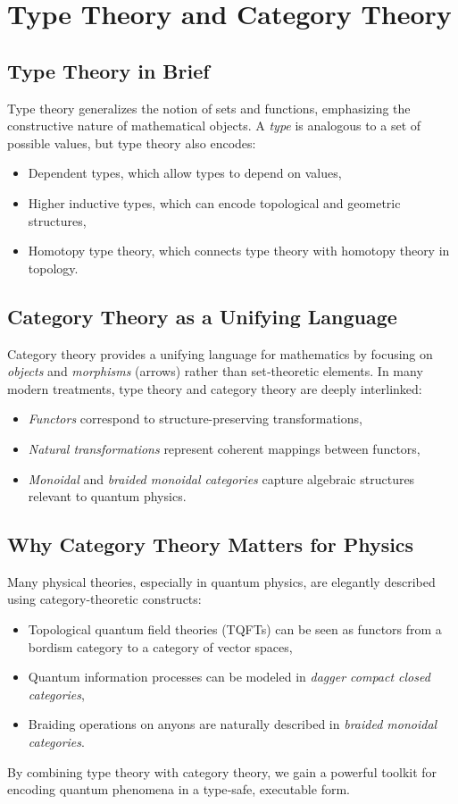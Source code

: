 \documentclass[12pt]{article}
\begin{document}
\section{Type Theory and Category Theory}
\label{sec:type_theory_cat}

\subsection{Type Theory in Brief}
Type theory generalizes the notion of sets and functions, emphasizing the constructive nature of mathematical objects. A \emph{type} is analogous to a set of possible values, but type theory also encodes:
\begin{itemize}[label=$\bullet$]
    \item Dependent types, which allow types to depend on values,
    \item Higher inductive types, which can encode topological and geometric structures,
    \item Homotopy type theory, which connects type theory with homotopy theory in topology.
\end{itemize}

\subsection{Category Theory as a Unifying Language}
Category theory provides a unifying language for mathematics by focusing on \emph{objects} and \emph{morphisms} (arrows) rather than set‐theoretic elements. In many modern treatments, type theory and category theory are deeply interlinked:
\begin{itemize}[label=$\bullet$]
    \item \emph{Functors} correspond to structure-preserving transformations,
    \item \emph{Natural transformations} represent coherent mappings between functors,
    \item \emph{Monoidal} and \emph{braided monoidal categories} capture algebraic structures relevant to quantum physics.
\end{itemize}

\subsection{Why Category Theory Matters for Physics}
Many physical theories, especially in quantum physics, are elegantly described using category-theoretic constructs:
\begin{itemize}[label=$\bullet$]
    \item Topological quantum field theories (TQFTs) can be seen as functors from a bordism category to a category of vector spaces,
    \item Quantum information processes can be modeled in \emph{dagger compact closed categories},
    \item Braiding operations on anyons are naturally described in \emph{braided monoidal categories}.
\end{itemize}
By combining type theory with category theory, we gain a powerful toolkit for encoding quantum phenomena in a type‐safe, executable form.
\end{document}
